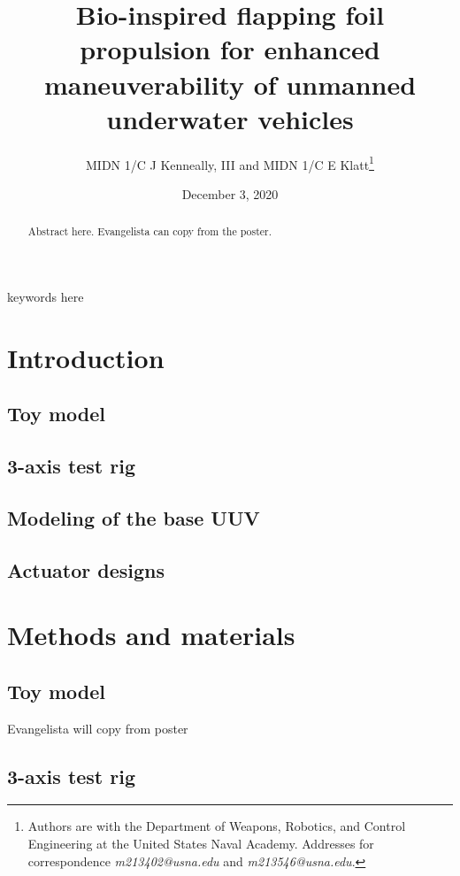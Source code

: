 \documentclass[twocolumn,10pt]{IEEEtran}
\title{Bio-inspired flapping foil propulsion for enhanced maneuverability of unmanned underwater vehicles}
\author{MIDN 1/C J Kenneally, III and MIDN 1/C E Klatt\thanks{Authors are with the Department of Weapons, Robotics, and Control Engineering at the United States Naval Academy. Addresses for correspondence \emph{m213402@usna.edu} and \emph{m213546@usna.edu}.}}
\date{December 3, 2020}
\begin{document}
\maketitle
\begin{abstract}
    Abstract here. Evangelista can copy from the poster. 
\end{abstract}

\begin{IEEEkeywords}
keywords here
\end{IEEEkeywords}


\section{Introduction}
\subsection{Toy model}
\subsection{3-axis test rig}
\subsection{Modeling of the base UUV}
\subsection{Actuator designs}

\section{Methods and materials}
\subsection{Toy model}
Evangelista will copy from poster
\subsection{3-axis test rig}
\end{document}
